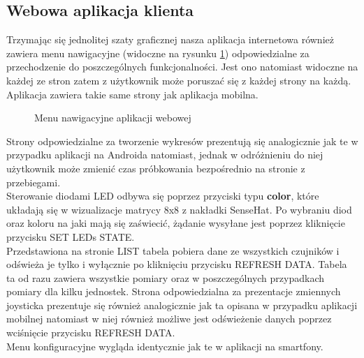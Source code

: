 \documentclass[11pt, a4paper]{article}
\begin{document}
\subsection{Webowa aplikacja klienta}
Trzymając się jednolitej szaty graficznej nasza aplikacja internetowa również zawiera menu nawigacyjne (widoczne na rysunku \ref{fig:fig3}) odpowiedzialne za przechodzenie do poszczególnych funkcjonalności. Jest ono natomiast widoczne na każdej ze stron zatem z użytkownik może poruszać się z każdej strony na każdą. Aplikacja zawiera takie same strony jak aplikacja mobilna. \\
\begin{figure}[H]
	\caption{Menu nawigacyjne aplikacji webowej}
	\label{fig:fig3}
\end{figure}

Strony odpowiedzialne za tworzenie wykresów prezentują się analogicznie jak te w przypadku aplikacji na Androida natomiast, jednak w odróżnieniu do niej użytkownik może zmienić czas próbkowania bezpośrednio na stronie z przebiegami. \\
Sterowanie diodami LED odbywa się poprzez przyciski typu \textbf{color}, które układają się w wizualizacje matrycy 8x8 z nakładki SenseHat. Po wybraniu diod oraz koloru na jaki mają się zaświecić, żądanie wysyłane jest poprzez kliknięcie przycisku SET LEDs STATE. \\
Przedstawiona na stronie LIST tabela pobiera dane ze wszystkich czujników i odświeża je tylko i wyłącznie po kliknięciu przycisku REFRESH DATA. Tabela ta od razu zawiera wszystkie pomiary oraz w poszczególnych przypadkach pomiary dla kilku jednostek.
Strona odpowiedzialna za prezentacje zmiennych joysticka prezentuje się również analogicznie jak ta opisana w przypadku aplikacji mobilnej natomiast w niej również możliwe jest odświeżenie danych poprzez wciśnięcie przycisku REFRESH DATA. \\
Menu konfiguracyjne wygląda identycznie jak te w aplikacji na smartfony.
\end{document}
